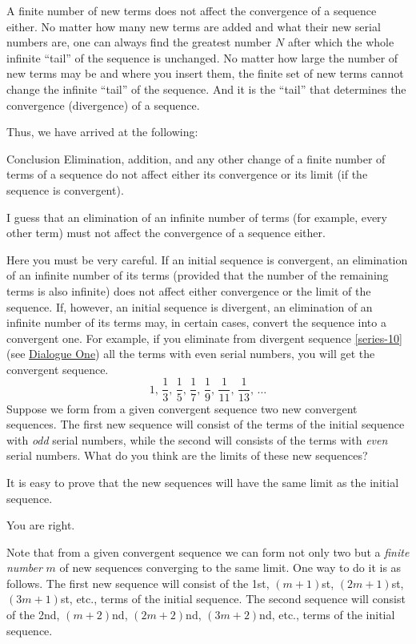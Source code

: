 {\athr A finite number of new terms does not affect the convergence of a sequence either. No matter how many new terms are added and what their new serial numbers are, one can always find the greatest number $N$ after which the whole infinite ``tail'' of the sequence is unchanged. No matter how large the number of new terms may be and where you insert them, the finite set of new terms cannot change the infinite ``tail'' of the sequence. And it is the ``tail'' that determines the convergence (divergence) of a sequence.

Thus, we have arrived at the following: 
\begin{mytheo}{Conclusion}
Elimination, addition, and any other change of a finite number of terms of a sequence do not affect either its convergence or its limit (if the sequence is convergent).
\end{mytheo}

\rdr I guess that an elimination of an infinite number of terms (for example, every other term) must not affect the convergence of a sequence either.

\athr Here you must be very careful. If an initial sequence is convergent, an elimination of an infinite number of its terms (provided that the number of the remaining terms is also infinite) does not affect either convergence or the limit of the sequence. If, however, an initial sequence is divergent, an elimination of an infinite number of its terms may, in certain cases, convert the sequence into a convergent one. For example, if you eliminate from divergent sequence \eqref{series-10} (see \hyperref[infinite-seq]{Dialogue One}) all the terms with even serial numbers, you will get the convergent sequence.
\begin{equation*}%
1, \, \frac{1}{3}, \, \frac{1}{5}, \,\frac{1}{7}, \,\frac{1}{9}, \,\frac{1}{11}, \,\frac{1}{13}, \, \ldots
\end{equation*}
Suppose we form from a given convergent sequence two new convergent sequences. The first new sequence will consist of the terms of the initial sequence with \emph{odd} serial numbers, while the second will consists of the terms with \emph{even} serial numbers. What do you think are the limits of these new sequences?

\rdr It is easy to prove that the new sequences will have the same limit as the initial sequence.

\athr You are right. 

Note that from a given convergent sequence we can form not only two but a \emph{finite number} $m$ of new sequences converging to the same limit. One way to do it is as follows. The first	new sequence will consist of the 1st, $(m + 1)$st, $(2m + 1)$st, $(3m + 1)$st, etc., terms of the initial sequence. The second	sequence will consist of the 2nd, $(m + 2)$nd, $(2m + 2)$nd, $(3m + 2)$nd, etc., terms of the initial sequence.

}
